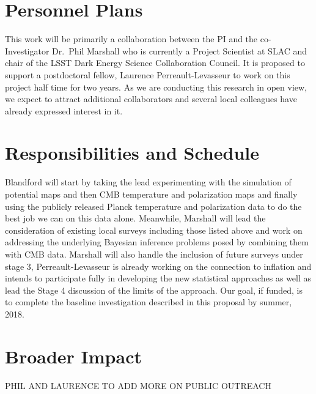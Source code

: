 \documentclass[psfig,11pt]{article}
\begin{document}
{\section{Personnel Plans}

This work will be primarily a collaboration between the PI and the co-Investigator Dr.\ Phil Marshall who is currently a Project Scientist at SLAC and chair of the LSST Dark Energy Science Collaboration Council. It is proposed to support a postdoctoral fellow, Laurence Perreault-Levasseur to work on this project half time for two years. As we are conducting this research in open view, we expect to attract additional collaborators and several local colleagues have already expressed interest in it.


\section{Responsibilities and Schedule}

Blandford will start by taking the lead experimenting with the simulation of potential maps and then CMB temperature and polarization maps and finally using the publicly released Planck temperature and polarization data to do the best job we can on this data alone. Meanwhile, Marshall will lead the consideration of existing local surveys including those listed above and work on addressing the underlying Bayesian inference problems posed by combining them with CMB data. Marshall will also handle the inclusion of future surveys under stage 3, Perreault-Levasseur is already working on the connection to inflation and intends to participate fully in developing the new statistical approaches as well as lead the Stage 4 discussion of the limits of the approach. Our goal, if funded, is to complete the baseline investigation described in this proposal by summer, 2018.

\section{Broader Impact}

PHIL  AND LAURENCE TO ADD MORE ON PUBLIC OUTREACH

}
\end{document}
